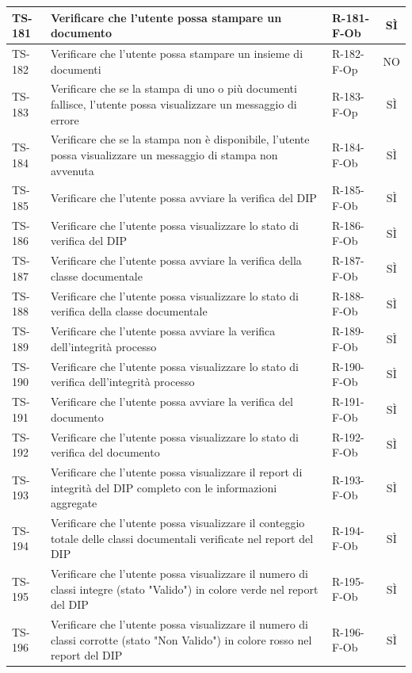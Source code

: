 \documentclass[a4paper,12pt]{article}
\begin{document}
\begin{longtable}{|p{1.5cm}|p{8.3cm}|p{2.4cm}|c|}
\hline
TS-181 & Verificare che l'utente possa stampare un documento & R-181-F-Ob & SÌ \\
\hline
TS-182 & Verificare che l'utente possa stampare un insieme di documenti & R-182-F-Op & NO \\
\hline
TS-183 & Verificare che se la stampa di uno o più documenti fallisce, l'utente possa visualizzare un messaggio di errore & R-183-F-Op & SÌ \\
\hline
TS-184 & Verificare che se la stampa non è disponibile, l'utente possa visualizzare un messaggio di stampa non avvenuta & R-184-F-Ob & SÌ \\
\hline
TS-185 & Verificare che l'utente possa avviare la verifica del DIP & R-185-F-Ob & SÌ \\
\hline
TS-186 & Verificare che l'utente possa visualizzare lo stato di verifica del DIP & R-186-F-Ob & SÌ \\
\hline
TS-187 & Verificare che l'utente possa avviare la verifica della classe documentale & R-187-F-Ob & SÌ \\
\hline
TS-188 & Verificare che l'utente possa visualizzare lo stato di verifica della classe documentale & R-188-F-Ob & SÌ \\
\hline
TS-189 & Verificare che l'utente possa avviare la verifica dell'integrità processo & R-189-F-Ob & SÌ \\
\hline
TS-190 & Verificare che l'utente possa visualizzare lo stato di verifica dell'integrità processo & R-190-F-Ob & SÌ \\
\hline
TS-191 & Verificare che l'utente possa avviare la verifica del documento & R-191-F-Ob & SÌ \\
\hline
TS-192 & Verificare che l'utente possa visualizzare lo stato di verifica del documento & R-192-F-Ob & SÌ \\
\hline
TS-193 & Verificare che l'utente possa visualizzare il report di integrità del DIP completo con le informazioni aggregate & R-193-F-Ob & SÌ \\
\hline
TS-194 & Verificare che l'utente possa visualizzare il conteggio totale delle classi documentali verificate nel report del DIP & R-194-F-Ob & SÌ \\
\hline
TS-195 & Verificare che l'utente possa visualizzare il numero di classi integre (stato "Valido") in colore verde nel report del DIP & R-195-F-Ob & SÌ \\
\hline
TS-196 & Verificare che l'utente possa visualizzare il numero di classi corrotte (stato "Non Valido") in colore rosso nel report del DIP & R-196-F-Ob & SÌ \\

\end{longtable}
\end{document}
